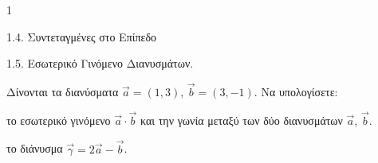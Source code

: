 \begin{ylh}{1}
    \item 1.4. Συντεταγμένες στο Επίπεδο
    \item 1.5. Εσωτερικό Γινόμενο Διανυσμάτων.
\end{ylh}
Δίνονται τα διανύσματα $\vec{a} = (1,3)$, $\vec{b} = (3,-1)$.
Να υπολογίσετε:
\begin{alist}
\item το εσωτερικό γινόμενο $\vec{a} \cdot \vec{b}$ και την γωνία μεταξύ των δύο διανυσμάτων $\vec{a}$, $\vec{b}$. 
\item το διάνυσμα $\vec{\gamma} = 2\vec{a} - \vec{b}$. 
\end{alist}